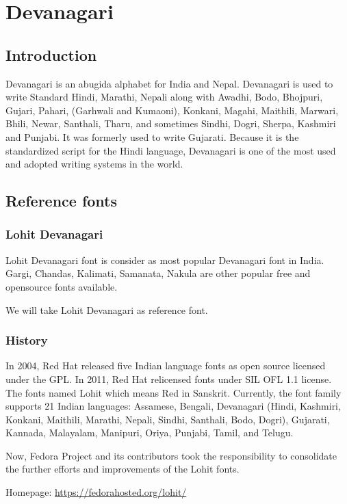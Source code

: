 \chapter{Devanagari}
\section{Introduction}

Devanagari is an abugida alphabet for India and Nepal. Devanagari is used to
write Standard Hindi, Marathi, Nepali along with Awadhi, Bodo, Bhojpuri,
Gujari, Pahari, (Garhwali and Kumaoni), Konkani, Magahi, Maithili, Marwari,
Bhili, Newar, Santhali, Tharu, and sometimes Sindhi, Dogri, Sherpa, Kashmiri
and Punjabi. It was formerly used to write Gujarati. Because it is the
standardized script for the Hindi language, Devanagari is one of the most used
and adopted writing systems in the world.

\section{Reference fonts}

\subsection{Lohit Devanagari}
Lohit Devanagari font is consider as most popular Devanagari font in India.
Gargi, Chandas, Kalimati, Samanata, Nakula are other popular free and
opensource fonts available.

We will take Lohit Devanagari as reference font.

\subsection{History}
In 2004, Red Hat released five Indian language fonts as open source licensed
under the GPL. In 2011, Red Hat relicensed fonts under SIL OFL 1.1 license.
The fonts named Lohit which means Red in Sanskrit. Currently, the font family
supports 21 Indian languages: Assamese, Bengali, Devanagari (Hindi, Kashmiri,
Konkani, Maithili, Marathi, Nepali, Sindhi, Santhali, Bodo, Dogri), Gujarati,
Kannada, Malayalam, Manipuri, Oriya, Punjabi, Tamil, and Telugu.

Now, Fedora Project and its contributors took the responsibility to consolidate
the further efforts and improvements of the Lohit fonts.

Homepage: {\url{https://fedorahosted.org/lohit/}}
